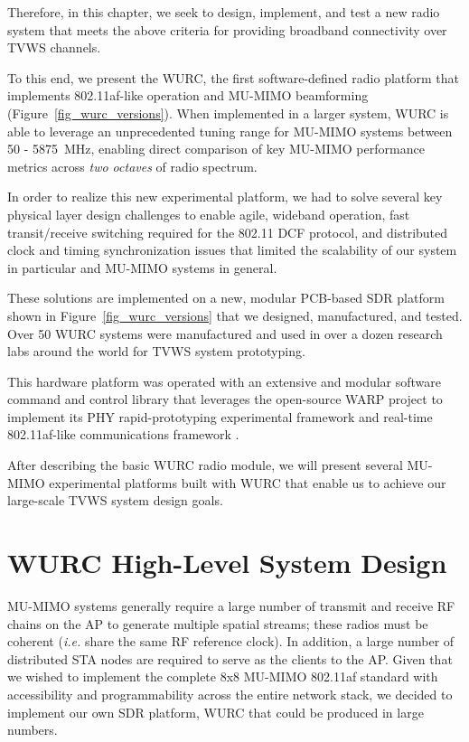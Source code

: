 	Therefore, in this chapter, we seek to design, implement, and test a new radio system that meets the above criteria for providing broadband connectivity over \ac{TVWS} channels.
	
	To this end, we present the \acf{WURC}, the first software-defined radio platform that implements 802.11af-like operation and \ac{MU-MIMO} beamforming \cite{WURC} (Figure~\ref{fig_wurc_versions}).
	When implemented in a larger system, \ac{WURC} is able to leverage an unprecedented tuning range for \ac{MU-MIMO} systems between 50 - 5875~MHz, enabling direct comparison of key \ac{MU-MIMO} performance metrics across \emph{two octaves} of radio spectrum.
	
	In order to realize this new experimental platform, we had to solve several key physical layer design challenges to enable agile, wideband operation, fast transit/receive switching required for the 802.11 \ac{DCF} protocol, and distributed clock and timing synchronization issues that limited the scalability of our system in particular and \ac{MU-MIMO} systems in general.
	
	These solutions are implemented on a new, modular PCB-based \ac{SDR} platform shown in Figure~\ref{fig_wurc_versions} that we designed, manufactured, and tested. Over 50 \ac{WURC} systems were manufactured and used in over a dozen research labs around the world for \ac{TVWS} system prototyping.
		
	This hardware platform was operated with an extensive and modular software command and control library that leverages the open-source WARP project to implement its \ac{PHY} rapid-prototyping experimental framework and real-time 802.11af-like communications framework \cite{warpProject}.

	After describing the basic \ac{WURC} radio module, we will present several \ac{MU-MIMO} experimental platforms built with \ac{WURC} that enable us to achieve our large-scale \ac{TVWS} system design goals.


\section{WURC High-Level System Design}
\label{sec_wurc_module}

	\ac{MU-MIMO} systems generally require a large number of transmit and receive RF chains on the \ac{AP} to generate multiple spatial streams; these radios must be coherent (\emph{i.e.} share the same RF reference clock).
	In addition, a large number of distributed \ac{STA} nodes are required to serve as the clients to the \ac{AP}.
	Given that we wished to implement the complete 8x8 \ac{MU-MIMO} 802.11af standard with accessibility and programmability across the entire network stack, we decided to implement our own \ac{SDR} platform, \ac{WURC} that could be produced in large numbers.

